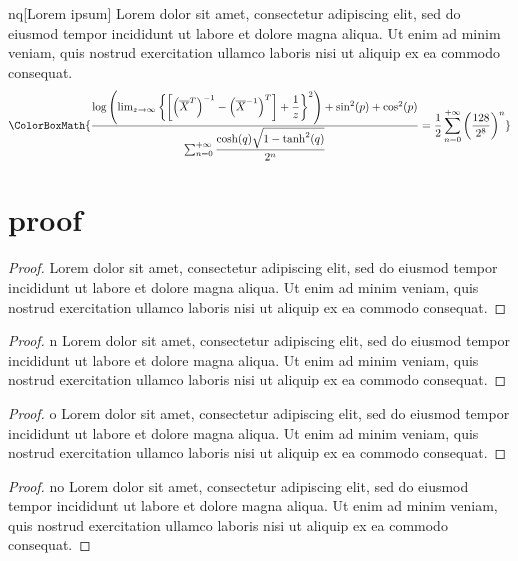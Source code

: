 \begin{property}{nq}[Lorem ipsum]
	Lorem dolor sit amet, consectetur adipiscing elit, sed do eiusmod tempor incididunt ut labore et dolore magna aliqua. Ut enim ad minim veniam, quis nostrud exercitation ullamco laboris nisi ut aliquip ex ea commodo consequat.
	\begin{equation*}
		\ColorBoxMath{\dfrac{\log\left(\lim_{z\to\infty}\left\{\left[\left(\overline{X}^{T}\right)^{-1}-\left(\overline{X}^{-1}\right)^T\right]+\dfrac{1}{z}\right\}^2\right)+\sin^2(p)+\cos^2(p)}{\sum_{n=0}^{+\infty}\dfrac{\cosh(q)\sqrt{1-\tanh^2(q)}}{2^n}}=\dfrac{1}{2}\sum_{n=0}^{+\infty}\left(\dfrac{128}{2^8}\right)^n}\qedhere
	\end{equation*}
\end{property}

\newpage

\section{proof}

\begin{proof}{}
	Lorem dolor sit amet, consectetur adipiscing elit, sed do eiusmod tempor incididunt ut labore et dolore magna aliqua. Ut enim ad minim veniam, quis nostrud exercitation ullamco laboris nisi ut aliquip ex ea commodo consequat.
\end{proof}

\begin{proof}{n}
	Lorem dolor sit amet, consectetur adipiscing elit, sed do eiusmod tempor incididunt ut labore et dolore magna aliqua. Ut enim ad minim veniam, quis nostrud exercitation ullamco laboris nisi ut aliquip ex ea commodo consequat.
\end{proof}

\begin{proof}{o}
	Lorem dolor sit amet, consectetur adipiscing elit, sed do eiusmod tempor incididunt ut labore et dolore magna aliqua. Ut enim ad minim veniam, quis nostrud exercitation ullamco laboris nisi ut aliquip ex ea commodo consequat.
\end{proof}

\begin{proof}{no}
	Lorem dolor sit amet, consectetur adipiscing elit, sed do eiusmod tempor incididunt ut labore et dolore magna aliqua. Ut enim ad minim veniam, quis nostrud exercitation ullamco laboris nisi ut aliquip ex ea commodo consequat.
\end{proof}

